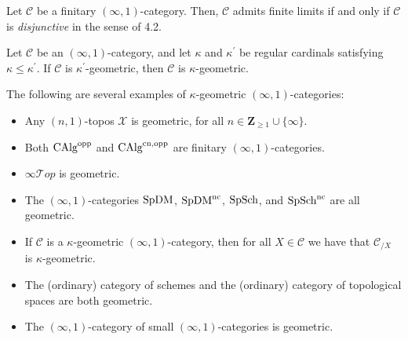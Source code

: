 \documentclass[10pt]{article}
\newcommand{\C}{\mathcal C}
\newcommand{\cT}{\mathcal{T}}
\newcommand{\cX}{\mathcal{X}}
\newcommand{\ZZ}{\mathbb{Z}}
\def\ZZ{{\mathbf Z}}
\theoremstyle{witharg}
\theoremstyle{witharg}
\theoremstyle{witharg2}
\begin{document}
\begin{remark}{}

    Let $\C$ be a finitary $(\infty,1)$-category. Then, $\C$ admits finite limits if and only if $\C$ is \emph{disjunctive} in the sense of  4.2.
    
\end{remark}

\begin{remark}{}

    Let $\C$ be an $(\infty,1)$-category, and let $\kappa$ and $\kappa^\prime$ be regular cardinals satisfying $\kappa\leq \kappa^\prime$. If $\C$ is $\kappa^\prime$-geometric, then $\C$ is $\kappa$-geometric.
    
\end{remark}



\begin{example}{}\label{Geom Cats. Remark}

   The following are several examples of $\kappa$-geometric $(\infty,1)$-categories: 

    \begin{itemize}
        \item [$(1)$] Any $(n,1)$-topos $\cX$ is geometric, for all $n\in \ZZ_{\geq 1}\cup \{\infty\}$. 
    
        \item [$(2)$] Both $\textnormal{CAlg}^{\textnormal{opp}}$ and $\textnormal{CAlg}^{\textnormal{cn},\textnormal{opp}}$ are finitary $(\infty,1)$-categories.

        \item [$(3)$] $\infty\cT op$ is geometric. 

        \item [$(4)$] The $(\infty,1)$-categories $\textnormal{SpDM}$, $\textnormal{SpDM}^{\textnormal{nc}}$, $\textnormal{SpSch}$, and $\textnormal{SpSch}^{\textnormal{nc}}$ are all geometric. 

      

        \item [(5)] If $\C$ is a $\kappa$-geometric $(\infty,1)$-category, then for all $X\in \C$ we have that $\C_{/X}$ is $\kappa$-geometric. 

        \item [(6)] The (ordinary) category of schemes and the (ordinary) category of topological spaces are both geometric.

        \item [(7)] The $(\infty,1)$-category of small $(\infty,1)$-categories is geometric.

    \end{itemize}

    
\end{example}
\end{document}
